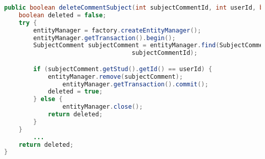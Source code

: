 \begin{lstlisting}[language=Java,  basicstyle=\footnotesize]
public boolean deleteCommentSubject(int subjectCommentId, int userId, boolean admin) {
	boolean deleted = false;
	try {
		entityManager = factory.createEntityManager();
		entityManager.getTransaction().begin();
		SubjectComment subjectComment = entityManager.find(SubjectComment.class,
								   subjectCommentId);

		if (subjectComment.getStud().getId() == userId) {
			entityManager.remove(subjectComment);
                entityManager.getTransaction().commit();
			deleted = true;
		} else {
                entityManager.close();
			return deleted;
		}
	} 
        ...
	return deleted;
}
\end{lstlisting}
